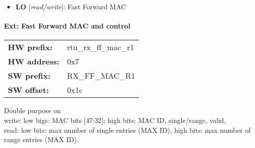 \begin{itemize}
\item \begin{small}
{\bf 
LO
} [\emph{read/write}]: Fast Forward MAC
\end{small}
\end{itemize}
\paragraph*{Ext: Fast Forward MAC and control}\vspace{12pt}

\begin{tabular}{l l }
{\bf HW prefix:}  & rtu\_rx\_ff\_mac\_r1\\
{\bf HW address:}  & 0x7\\
{\bf SW prefix:}  & RX\_FF\_MAC\_R1\\
{\bf SW offset:}  & 0x1c\\
\end{tabular}

\vspace{12pt}
Double purpose on \\                 write: low bigs: MAC bits [47:32]; high bits: MAC ID, single/range, valid,\\                 read: low bits: max number of single entries (MAX ID), high bits: max number of range entries (MAX ID).

\vspace{12pt}
\noindent
{}

